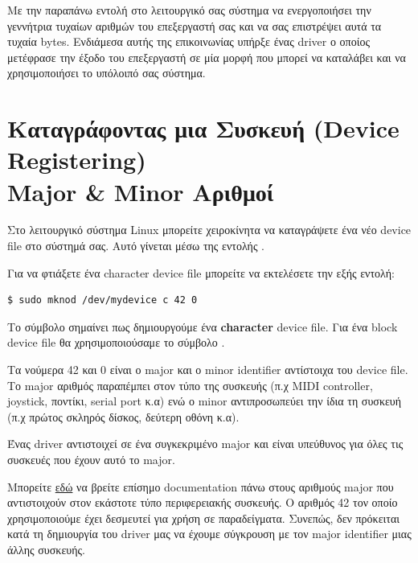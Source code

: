 \documentclass[18pt]{extarticle}
\begin{document}
Με την παραπάνω εντολή  στο λειτουργικό σας σύστημα να ενεργοποιήσει την γεννήτρια τυχαίων αριθμών του επεξεργαστή σας και να σας επιστρέψει αυτά τα τυχαία bytes.
Ενδιάμεσα αυτής της επικοινωνίας υπήρξε ένας driver ο οποίος μετέφρασε την έξοδο του επεξεργαστή σε μία μορφή που μπορεί να καταλάβει και να χρησιμοποιήσει το υπόλοιπό σας σύστημα.

\section{Καταγράφοντας μια Συσκευή (Device Registering)\\ Major \& Minor Αριθμοί}

Στο λειτουργικό σύστημα Linux μπορείτε χειροκίνητα να καταγράψετε ένα νέο device file στο σύστημά σας.
Αυτό γίνεται μέσω της εντολής .

Για να φτιάξετε ένα character device file μπορείτε να εκτελέσετε την εξής εντολή:

\begin{commandline}
\begin{verbatim}
$ sudo mknod /dev/mydevice c 42 0
\end{verbatim}
\end{commandline}

Το σύμβολο  σημαίνει πως δημιουργούμε ένα \textbf{character} device file.
Για ένα block device file θα χρησιμοποιούσαμε το σύμβολο .

Τα νούμερα 42 και 0 είναι ο major και ο minor identifier αντίστοιχα του device file.
Το major αριθμός παραπέμπει στον τύπο της συσκευής (π.χ MIDI controller, joystick, ποντίκι, serial port κ.α) ενώ 
ο minor αντιπροσωπεύει την ίδια τη συσκευή (π.χ πρώτος σκληρός δίσκος, δεύτερη οθόνη κ.α).

Ένας driver αντιστοιχεί σε ένα συγκεκριμένο major και είναι υπεύθυνος για όλες τις συσκευές που έχουν αυτό το major.

\begin{info}[Σημείωση]
    Μπορείτε \href{https://github.com/torvalds/linux/blob/master/Documentation/admin-guide/devices.txt}{εδώ} να βρείτε επίσημο documentation πάνω στους αριθμούς major που αντιστοιχούν στον εκάστοτε τύπο περιφερειακής συσκευής.
   Ο αριθμός 42 τον οποίο χρησιμοποιούμε έχει δεσμευτεί για χρήση σε παραδείγματα. 
   Συνεπώς, δεν πρόκειται κατά τη δημιουργία του driver μας να έχουμε σύγκρουση με τον major identifier μιας άλλης συσκευής. 
\end{info}
\end{document}
